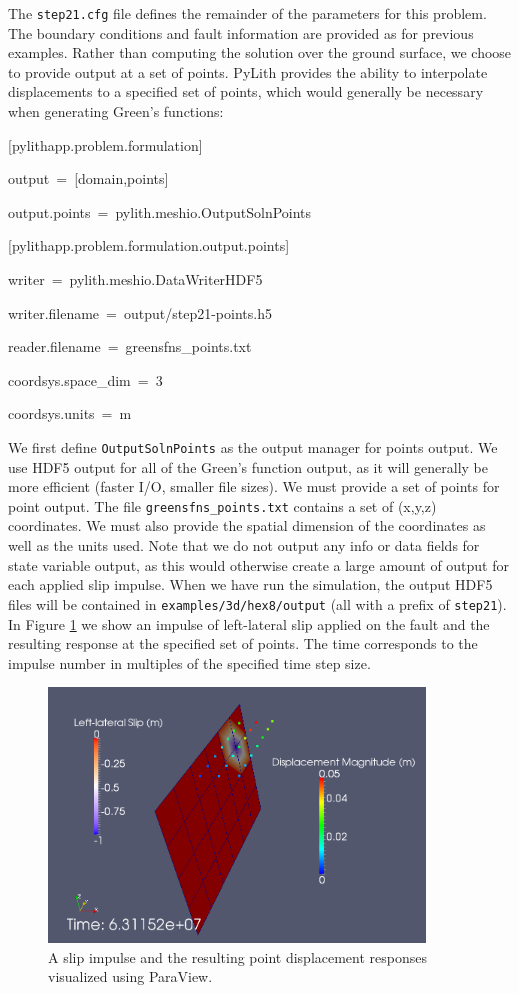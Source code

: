 The \texttt{step21.cfg} file defines the remainder of the parameters
for this problem. The boundary conditions and fault information are
provided as for previous examples. Rather than computing the solution
over the ground surface, we choose to provide output at a set of points.
PyLith provides the ability to interpolate displacements to a specified
set of points, which would generally be necessary when generating
Green's functions:
\begin{lyxcode}
{[}pylithapp.problem.formulation{]}

output~=~{[}domain,points{]}

output.points~=~pylith.meshio.OutputSolnPoints



{[}pylithapp.problem.formulation.output.points{]}

writer~=~pylith.meshio.DataWriterHDF5

writer.filename~=~output/step21-points.h5

reader.filename~=~greensfns\_points.txt

coordsys.space\_dim~=~3

coordsys.units~=~m
\end{lyxcode}
We first define \texttt{OutputSolnPoints} as the output manager for
points output. We use HDF5 output for all of the Green's function
output, as it will generally be more efficient (faster I/O, smaller
file sizes). We must provide a set of points for point output. The
file \texttt{greensfns\_points.txt} contains a set of (x,y,z) coordinates.
We must also provide the spatial dimension of the coordinates as well
as the units used. Note that we do not output any info or data fields
for state variable output, as this would otherwise create a large
amount of output for each applied slip impulse. When we have run the
simulation, the output HDF5 files will be contained in \texttt{examples/3d/hex8/output}
(all with a prefix of \texttt{step21}). In Figure \ref{fig:step21-imp-resp}
we show an impulse of left-lateral slip applied on the fault and the
resulting response at the specified set of points. The time corresponds
to the impulse number in multiples of the specified time step size.

\begin{figure}
\begin{centering}
\includegraphics[width=10cm]{tutorials/3dhex8/figs/step21_impulse_resp}
\par\end{centering}

\caption{A slip impulse and the resulting point displacement responses visualized
using ParaView. \label{fig:step21-imp-resp}}
\end{figure}

